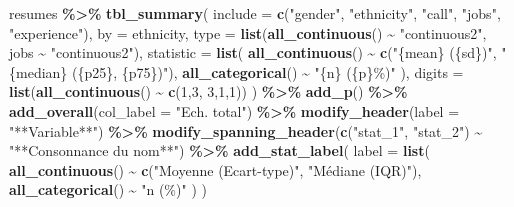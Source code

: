 \documentclass[
  11pt,
]{book}
\newenvironment{Shaded}{\begin{snugshade}}{\end{snugshade}}
\newcommand{\AttributeTok}[1]{\textcolor[rgb]{0.13,0.29,0.53}{#1}}
\newcommand{\DecValTok}[1]{\textcolor[rgb]{0.00,0.00,0.81}{#1}}
\newcommand{\FunctionTok}[1]{\textcolor[rgb]{0.13,0.29,0.53}{\textbf{#1}}}
\newcommand{\NormalTok}[1]{#1}
\newcommand{\SpecialCharTok}[1]{\textcolor[rgb]{0.81,0.36,0.00}{\textbf{#1}}}
\newcommand{\StringTok}[1]{\textcolor[rgb]{0.31,0.60,0.02}{#1}}
\numberwithin{equation}{section}
\numberwithin{countremarque}{section}
\begin{document}
\begin{Shaded}
\begin{Highlighting}[]
\NormalTok{resumes }\SpecialCharTok{\%\textgreater{}\%}
  \FunctionTok{tbl\_summary}\NormalTok{(}
    \AttributeTok{include =} \FunctionTok{c}\NormalTok{(}\StringTok{"gender"}\NormalTok{, }\StringTok{"ethnicity"}\NormalTok{, }\StringTok{"call"}\NormalTok{, }\StringTok{"jobs"}\NormalTok{, }\StringTok{"experience"}\NormalTok{),}
    \AttributeTok{by =}\NormalTok{ ethnicity,}
    \AttributeTok{type =} \FunctionTok{list}\NormalTok{(}\FunctionTok{all\_continuous}\NormalTok{() }\SpecialCharTok{\textasciitilde{}} \StringTok{"continuous2"}\NormalTok{,}
\NormalTok{                jobs }\SpecialCharTok{\textasciitilde{}} \StringTok{"continuous2"}\NormalTok{),}
    \AttributeTok{statistic =} \FunctionTok{list}\NormalTok{(}
      \FunctionTok{all\_continuous}\NormalTok{() }\SpecialCharTok{\textasciitilde{}} \FunctionTok{c}\NormalTok{(}\StringTok{"\{mean\} (\{sd\})"}\NormalTok{, }\StringTok{"\{median\} (\{p25\}, \{p75\})"}\NormalTok{),}
      \FunctionTok{all\_categorical}\NormalTok{() }\SpecialCharTok{\textasciitilde{}} \StringTok{"\{n\} (\{p\}\%)"}
\NormalTok{      ),}
    \AttributeTok{digits =} \FunctionTok{list}\NormalTok{(}\FunctionTok{all\_continuous}\NormalTok{() }\SpecialCharTok{\textasciitilde{}} \FunctionTok{c}\NormalTok{(}\DecValTok{1}\NormalTok{,}\DecValTok{3}\NormalTok{, }\DecValTok{3}\NormalTok{,}\DecValTok{1}\NormalTok{,}\DecValTok{1}\NormalTok{))}
\NormalTok{    ) }\SpecialCharTok{\%\textgreater{}\%} 
  \FunctionTok{add\_p}\NormalTok{() }\SpecialCharTok{\%\textgreater{}\%} 
  \FunctionTok{add\_overall}\NormalTok{(}\AttributeTok{col\_label =} \StringTok{"Ech. total"}\NormalTok{) }\SpecialCharTok{\%\textgreater{}\%} 
  \FunctionTok{modify\_header}\NormalTok{(}\AttributeTok{label =} \StringTok{"**Variable**"}\NormalTok{) }\SpecialCharTok{\%\textgreater{}\%} 
  \FunctionTok{modify\_spanning\_header}\NormalTok{(}\FunctionTok{c}\NormalTok{(}\StringTok{"stat\_1"}\NormalTok{, }\StringTok{"stat\_2"}\NormalTok{) }\SpecialCharTok{\textasciitilde{}} \StringTok{"**Consonnance du nom**"}\NormalTok{) }\SpecialCharTok{\%\textgreater{}\%} 
  \FunctionTok{add\_stat\_label}\NormalTok{(}
    \AttributeTok{label =} \FunctionTok{list}\NormalTok{(}
      \FunctionTok{all\_continuous}\NormalTok{() }\SpecialCharTok{\textasciitilde{}} \FunctionTok{c}\NormalTok{(}\StringTok{"Moyenne (Ecart{-}type)"}\NormalTok{, }\StringTok{"Médiane (IQR)"}\NormalTok{),}
      \FunctionTok{all\_categorical}\NormalTok{() }\SpecialCharTok{\textasciitilde{}} \StringTok{"n (\%)"}
\NormalTok{    )}
\NormalTok{  )}
\end{Highlighting}
\end{Shaded}
\end{document}
